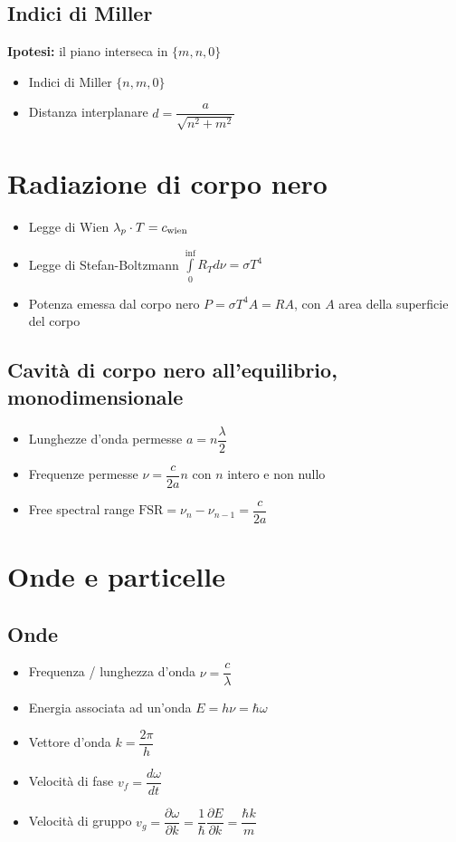 \documentclass{article}
\begin{document}
\subsection{Indici di Miller}
\textbf{Ipotesi:} il piano interseca in \( \{m, n, 0\} \)
\begin{itemize}
  \item Indici di Miller \( \{n, m, 0\} \)
  \item Distanza interplanare \( d = \dfrac{a}{\sqrt{n^2+m^2}} \)
\end{itemize}

\newpage

\section{Radiazione di corpo nero}
\begin{itemize}
  \item Legge di Wien \( \lambda_{p} \cdot T = c_{\textnormal{wien}} \)
  \item Legge di Stefan-Boltzmann \( \displaystyle \int\limits_{0}^{\inf} R_T d \nu = \sigma T ^ 4 \)
  \item Potenza emessa dal corpo nero \( P = \sigma T^4 A = R A \), con \(A\) area della superficie del corpo
\end{itemize}
\subsection{Cavità di corpo nero all'equilibrio, monodimensionale}
\begin{itemize}
  \item Lunghezze d'onda permesse \( a = n \dfrac{\lambda}{2} \)
  \item Frequenze permesse \( \nu = \dfrac{c}{2a} n \) con \( n \) intero e non nullo
  \item Free spectral range \( \text{FSR} = \nu_n - \nu_{n-1} = \dfrac{c}{2a} \)
\end{itemize}

\newpage

\section{Onde e particelle}
\subsection{Onde}
\begin{itemize}
  \item Frequenza / lunghezza d'onda \( \nu = \dfrac{c}{\lambda} \)
  \item Energia associata ad un'onda \( E = h \nu = \hbar \omega \)
  \item Vettore d'onda \( k = \dfrac{2 \pi}{h} \)
  \item Velocità di fase \( v_f = \dfrac{d \omega}{d t}\)
  \item Velocità di gruppo \( v_g = \dfrac{\partial \omega}{\partial k} = \dfrac{1}{\hbar} \dfrac{\partial E}{\partial k} =\dfrac{\hbar k}{m} \)
\end{itemize}
\end{document}
